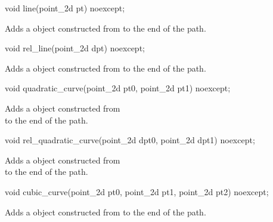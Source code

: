 %
\begin{itemdecl}
void line(point_2d pt) noexcept;
\end{itemdecl}
\begin{itemdescr}
\pnum
Adds a  object constructed from  to the end of the path.
\end{itemdescr}

%
\begin{itemdecl}
void rel_line(point_2d dpt) noexcept;
\end{itemdecl}
\begin{itemdescr}
\pnum
\effects
Adds a  object constructed from  to the end of the path.
\end{itemdescr}

%
\begin{itemdecl}
void quadratic_curve(point_2d pt0, point_2d pt1) noexcept;
\end{itemdecl}
\begin{itemdescr}
\pnum
\effects
Adds a  object constructed from\\  to the end of the path.
\end{itemdescr}

%
\begin{itemdecl}
void rel_quadratic_curve(point_2d dpt0, point_2d dpt1)
  noexcept;
\end{itemdecl}
\begin{itemdescr}
\pnum
\effects
Adds a  object constructed from\\  to the end of the path.
\end{itemdescr}

%
\begin{itemdecl}
void cubic_curve(point_2d pt0, point_2d pt1,
  point_2d pt2) noexcept;
\end{itemdecl}
\begin{itemdescr}
\pnum
\effects
\pnum
Adds a  object constructed from  to the end of the path.
\end{itemdescr}


